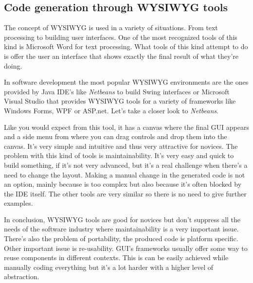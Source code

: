 \subsection{Code generation through WYSIWYG tools}
The concept of WYSIWYG is used in a variety of situations. From text processing to building user interfaces. One of the most recognized tools of this kind is Microsoft Word for text processing. What tools of this kind attempt to do is offer the user an interface that shows exactly the final result of what they're doing.

In software development the most popular WYSIWYG environments are the ones provided by Java IDE's like \textit{Netbeans} to build Swing interfaces or Microsoft Visual Studio that provides WYSIWYG tools for a variety of frameworks like Windows Forms, WPF or ASP.net. Let's take a closer look to \textit{Netbeans}.

Like you would expect from this tool, it has a canvas where the final GUI appears and a side menu from where you can drag controls and drop them into the canvas. It's very simple and intuitive and thus very attractive for novices. The problem with this kind of tools is maintainability. It's very easy and quick to build something, if it's not very advanced, but it's a real challenge when there's a need to change the layout. Making a manual change in the generated code is not an option, mainly because is too complex but also because it's often blocked by the IDE itself. The other tools are very similar so there is no need to give further examples.

In conclusion, WYSIWYG tools are good for novices but don't suppress all the needs of the software industry where maintainability is a very important issue. There's also the problem of portability, the produced code is platform specific. Other important issue is re-usability. GUI's frameworks usually offer some way to reuse components in different contexts. This is can be easily achieved while manually coding everything but it's a lot harder with a higher level of abstraction.
